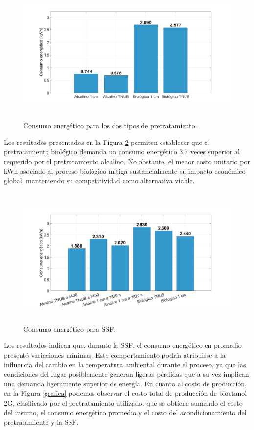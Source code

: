 \documentclass[12pt]{article}
\begin{document}
						\begin{figure} [H]
				\centering
				\includegraphics[width=16cm, height=7cm]{imagenes/consumoenergetico}
				\caption{Consumo energético para los dos tipos de pretratamiento. }
				\label{grafica3}
			\end{figure}
			
		Los resultados presentados en la Figura \ref{grafica1} permiten establecer que el pretratamiento biológico demanda un consumo energético 3.7 veces superior al requerido por el pretratamiento alcalino. No obstante, el menor costo unitario por kWh asociado al proceso biológico mitiga sustancialmente su impacto económico global, manteniendo su competitividad como alternativa viable.

\begin{figure} [H]
	\centering
	\includegraphics[width=16cm, height=7cm]{imagenes/CONSUMOENERGETICOSSF}
	\caption{Consumo energético para SSF. }
	\label{grafica1}
\end{figure}


Los resultados indican que, durante la SSF, el consumo energético en promedio presentó variaciones mínimas. Este comportamiento podría atribuirse a la influencia del cambio en la temperatura ambiental durante el proceso, ya que las condiciones del lugar posiblemente generan ligeras pérdidas que a su vez implican una demanda ligeramente superior de energía.
En cuanto al costo de producción, en la Figura \ref{grafica} podemos observar el costo total de producción de bioetanol 2G, clasificado por el pretratamiento utilizado, que se obtiene sumando el costo del insumo, el consumo energético promedio y el costo del acondicionamiento del pretratamiento y la SSF.
\end{document}
